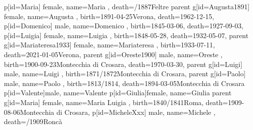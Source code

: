 \documentclass{article}
\begin{document}
\begin{midpage}
\begin{center}
\begin{genealogypicture}
{{{{{{                    }
                    p[id=Maria]{
                        female,
                        name={Maria },
                        death={/1887}{Feltre}
                    }
                }
            }
            parent{
                g[id=Augusta1891]{
                    female,
                    name={Augusta },
                    birth={1891-04-25}{Verona},
                    death={1962-12-15}{},
                }
                p[id=Domenico]{
                    male,
                    name={Domenico },
                    birth={1845-03-06}{},
                    death={1927-09-03}{},
                }
                p[id=Luigia]{
                    female,
                    name={Luigia },
                    birth={1848-05-28}{},
                    death={1932-05-07}{},
                }
            }
        }
        parent{
            g[id=Mariateresa1933]{
                female,
                name={Mariateresa },
                birth={1933-07-11}{},
                death={2021-01-05}{Verona},
            }
            parent{
                g[id=Oreste1900]{
                    male,
                    name={Oreste },
                    birth={1900-09-23}{Montecchia di Crosara},
                    death={1970-03-30}{},
                }
                parent{
                    g[id=Luigi]{
                        male,
                        name={Luigi },
                        birth={1871/1872}{Montecchia di Crosara},
                    }
                    parent{
                        g[id=Paolo]{
                            male,
                            name={Paolo },
                            birth={1813/1814}{},
                            death={1894-03-05}{Montecchia di Crosara}
                        }
                        p[id=Valente]{male, name={Valente }}
                        p[id=Giulia]{female, name={Giulia }}
                    }
                    parent{
                        g[id=Maria]{
                            female,
                            name={Maria Luigia },
                            birth={1840/1841}{Roma},
                            death={1909-08-06}{Montecchia di Crosara},
                        }
                        p[id=MicheleXxx]{
                            male,
                            name={Michele },
                            death={/1909}{Roncà}
}}}}}}}
\end{genealogypicture}
\end{center}
\end{midpage}
\end{document}
